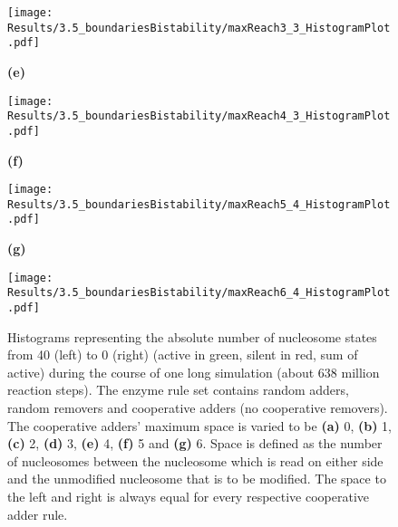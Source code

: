 \begin{figure}[htpb!]
\begin{minipage}{0.77\textwidth}
\begin{minipage}{0.65\textwidth}
                        \texttt{[image: Results/3.5\_boundariesBistability/maxReach3\_3\_HistogramPlot.pdf]}
                    \end{minipage}
                \end{minipage}
                \begin{minipage}{0.77\textwidth}
                    \begin{minipage}{0.1\textwidth}
                        \caption*{\small \textbf{(e)}}
                    \end{minipage}
                    \begin{minipage}{0.65\textwidth}
                        \texttt{[image: Results/3.5\_boundariesBistability/maxReach4\_3\_HistogramPlot.pdf]}
                    \end{minipage}
                \end{minipage}
                \begin{minipage}{0.77\textwidth}
                    \begin{minipage}{0.1\textwidth}
                        \caption*{\small \textbf{(f)}}
                    \end{minipage}
                    \begin{minipage}{0.65\textwidth}
                        \texttt{[image: Results/3.5\_boundariesBistability/maxReach5\_4\_HistogramPlot.pdf]}
                    \end{minipage}
                \end{minipage}
                \begin{minipage}{0.77\textwidth}
                    \begin{minipage}{0.1\textwidth}
                        \caption*{\small \textbf{(g)}}
                    \end{minipage}
                    \begin{minipage}{0.65\textwidth}
                        \texttt{[image: Results/3.5\_boundariesBistability/maxReach6\_4\_HistogramPlot.pdf]}
                    \end{minipage}
                \end{minipage}
                \caption{Histograms representing the absolute number of nucleosome states from 40 (left) to 0 (right) (active in green, silent in red, sum of active) during the course of one long simulation (about 638 million reaction steps). The enzyme rule set contains random adders, random removers and cooperative adders (no cooperative removers). The cooperative adders' maximum space is varied to be \textbf{(a)} 0, \textbf{(b)} 1, \textbf{(c)} 2, \textbf{(d)} 3, \textbf{(e)} 4, \textbf{(f)} 5 and \textbf{(g)} 6. Space is defined as the number of nucleosomes between the nucleosome which is read on either side and the unmodified nucleosome that is to be modified. The space to the left and right is always equal for every respective cooperative adder rule.}
                \label{img:enzymeReach}
            \end{figure}

